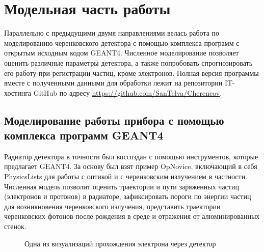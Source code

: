 \documentclass[12pt,a4paper]{report} %
\begin{document}
\chapter{Модельная часть работы}
Параллельно с предыдущими двумя направлениями велась работа по моделированию черенковского детектора с помощью комплекса программ с открытым исходным кодом GEANT4. Численное моделирование позволяет оценить различные параметры детектора, а также попробовать спрогнозировать его работу при регистрации частиц, кроме электронов. Полная версия программы вместе с полученными данными для обработки лежит на репозитории IT-хостинга GitHub по адресу \url{https://github.com/SanTelva/Cherencov}.
\section{Моделирование работы прибора с помощью комплекса программ GEANT4}
Радиатор детектора в точности был воссоздан с помощью инструментов, которые предлагает GEANT4. За основу был взят пример OpNovice, включающий в себя PhysicsLists для работы с оптикой и с черенковским излучением в частности. Численная модель позволит оценить траектории и пути заряженных частиц (электронов и протонов) в радиаторе, зафиксировать пороги по энергии частиц для возникновения черенковского излучения, представить траектории черенковских фотонов после рождения в среде и отражения от алюминированных стенок. 
\begin{figure}[t]
	\caption{Одна из визуализаций прохождения электрона через детектор}
	\label{model}	
\end{figure}
\end{document}
